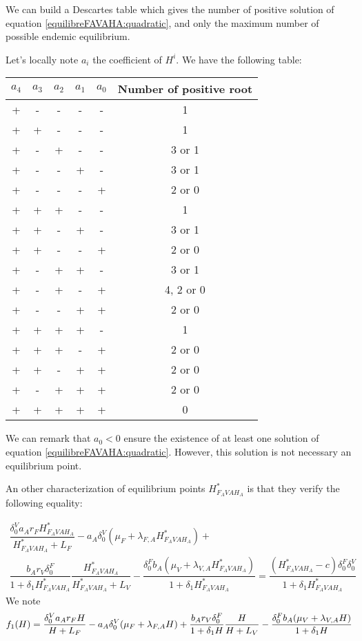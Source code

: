 \documentclass{article}
\newcommand{\lfa}{\lambda_{F, A}}
\newcommand{\lva}{\lambda_{V, A}}
\newcommand{\df}{\delta_0^F}
\newcommand{\dv}{\delta_0^V}
\begin{document}
We can build a Descartes table which gives the number of positive solution of equation \eqref{equilibreFAVAHA:quadratic}, and only the maximum number of possible endemic equilibrium.

\bigskip

Let's locally note $a_i$ the coefficient of $H^i$. We have the following table:

\begin{table}[!h]
\centering
\begin{tabular}{c|c|c|c|c|c}
$a_4$& $a_3$ & $a_2$ & $a_1$ & $a_0$ & Number of positive root \\
\hline
+ & - & - & - & - & 1 \\
+ & + & - & - & - & 1 \\
+ & - & + & - & - & 3 or 1 \\
+ & - & - & + & - & 3 or 1 \\
+ & - & - & - & + & 2 or 0 \\
+ & + & + & - & - & 1 \\
+ & + & - & + & - & 3 or 1 \\
+ & + & - & - & + & 2 or 0 \\
+ & - & + & + & - & 3 or 1 \\
+ & - & + & - & + & 4, 2 or 0 \\
+ & - & - & + & + & 2 or 0 \\
+ & + & + & + & - & 1 \\
+ & + & + & - & + & 2 or 0 \\
+ & + & - & + & + & 2 or 0 \\
+ & - & + & + & + & 2 or 0 \\
+ & + & + & + & + & 0 \\
\end{tabular}
\end{table}

We can remark that $a_0 < 0$ ensure the existence of at least one solution of equation \eqref{equilibreFAVAHA:quadratic}. However, this solution is not necessary an equilibrium point.

An other characterization of equilibrium points $H^*_{F_AVAH_A}$ is that they verify the following equality:

\begin{multline}
\dfrac{\dv a_A r_F H^*_{F_AVAH_A}}{H^*_{F_AVAH_A} + L_F} - a_A \dv (\mu_F + \lfa H^*_{F_AVAH_A}) + \\ \dfrac{ b_A r_V \df}{1+ \delta_1 H^*_{F_AVAH_A}} \dfrac{H^*_{F_AVAH_A}}{H^*_{F_AVAH_A} + L_V} - \dfrac{\df b_A (\mu_V + \lva H^*_{F_AVAH_A})}{1 + \delta_1 H^*_{F_AVAH_A}} = \dfrac{(H^*_{F_AVAH_A}- c) \df \dv}{1 + \delta_1 H^*_{F_AVAH_A}}
\label{equilibreFAVAHA:equation fonction}
\end{multline}
We note 
$$
f_1(H) = \dfrac{\dv a_A r_F H}{H + L_F} - a_A \dv (\mu_F + \lfa H) + \\ \dfrac{ b_A r_V \df}{1+ \delta_1 H} \dfrac{H}{H + L_V} - \dfrac{\df b_A (\mu_V + \lva H)}{1 + \delta_1 H}
$$
\end{document}
